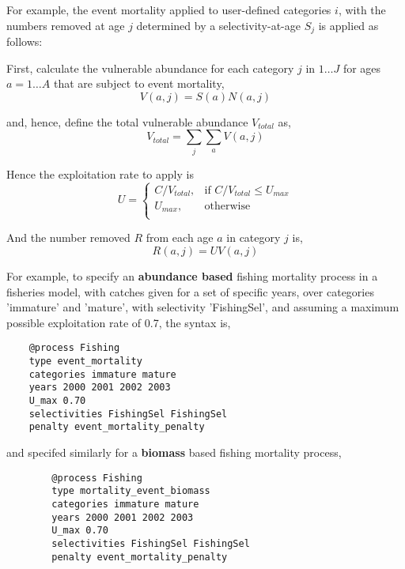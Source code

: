 For example, the event mortality applied to user-defined categories $i$, with the numbers removed at age $j$ determined by a selectivity-at-age $S_j$ is applied as follows:

First, calculate the vulnerable abundance for each category $j$ in $1 \ldots J$ for ages $a = 1 \ldots A$ that are subject to event mortality,
\begin{equation}
  V(a,j) = S(a) N(a,j)
\end{equation}

and, hence, define the total vulnerable abundance $V_{total}$ as,
\begin{equation}
  V_{total}  = \sum\limits_j {\sum\limits_a {V(a,j)}} 
\end{equation}

Hence the exploitation rate to apply is 
\begin{equation}
U = \begin{cases}
  C/V_{total}, & \text{if $C/V_{total} \leq U_{max}$} \\
  U_{max}, & \text{otherwise}\\ 
  \end{cases} 
\end{equation}

And the number removed $R$ from each age $a$ in category $j$ is,
\begin{equation}
  R(a,j) = UV(a,j)
\end{equation}

For example, to specify an \textbf{abundance based} fishing mortality process in a fisheries model, with catches given for a set of specific years, over categories 'immature' and 'mature', with selectivity 'FishingSel', and assuming a maximum possible exploitation rate of 0.7, the syntax is,

{\small{\begin{verbatim}
	@process Fishing
	type event_mortality
	categories immature mature
	years 2000 2001 2002 2003
	U_max 0.70
	selectivities FishingSel FishingSel
	penalty event_mortality_penalty
	\end{verbatim}}}

and specifed similarly for a \textbf{biomass} based fishing mortality process,

{\small{\begin{verbatim}
		@process Fishing
		type mortality_event_biomass
		categories immature mature
		years 2000 2001 2002 2003
		U_max 0.70
		selectivities FishingSel FishingSel
		penalty event_mortality_penalty
		\end{verbatim}}}


